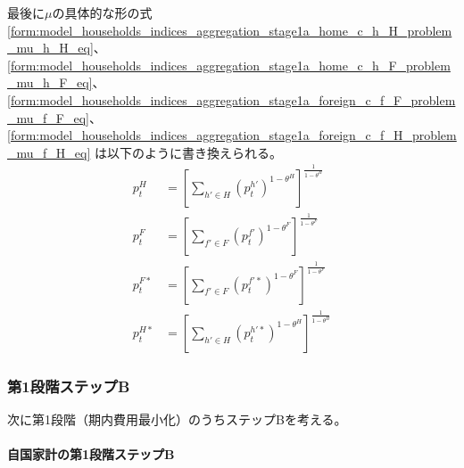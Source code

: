 最後に\(\mu\)の具体的な形の式
\eqref{form:model_households_indices_aggregation_stage1a_home_c_h_H_problem_mu_h_H_eq}、
\eqref{form:model_households_indices_aggregation_stage1a_home_c_h_F_problem_mu_h_F_eq}、
\eqref{form:model_households_indices_aggregation_stage1a_foreign_c_f_F_problem_mu_f_F_eq}、
\eqref{form:model_households_indices_aggregation_stage1a_foreign_c_f_H_problem_mu_f_H_eq}
は以下のように書き換えられる。
\begin{align}
    \label{form:model_households_indices_aggregation_stage1a_ppi_descriptions_p_H_eq}
        p_t^H&=\left[\sum_{h'\in H}(p_t^{h'})^{1-\theta^H}\right]^{\frac{1}{1-\theta^H}} \\
    \label{form:model_households_indices_aggregation_stage1a_ppi_descriptions_p_F_eq}
        p_t^F&=\left[\sum_{f'\in F}(p_t^{f'})^{1-\theta^F}\right]^{\frac{1}{1-\theta^F}} \\
    \label{form:model_households_indices_aggregation_stage1a_ppi_descriptions_p_F_star_eq}
        p_t^{F*}&=\left[\sum_{f'\in F}(p_t^{f'*})^{1-\theta^F}\right]^{\frac{1}{1-\theta^F}} \\
    \label{form:model_households_indices_aggregation_stage1a_ppi_descriptions_p_H_star_eq}
        p_t^{H*}&=\left[\sum_{h'\in H}(p_t^{h'*})^{1-\theta^H}\right]^{\frac{1}{1-\theta^H}}
\end{align}

\subsubsection{第1段階ステップB}
\label{sec:model_households_indices_aggregation_stage1b}

次に第1段階（期内費用最小化）のうちステップBを考える。

\paragraph{自国家計の第1段階ステップB}
\label{sec:model_households_indices_aggregation_stage1b_home}

